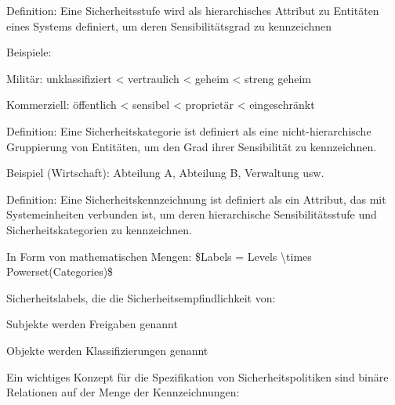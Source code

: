 \documentclass[a4paper]{article}
\begin{document}
\begin{multicols}{3}
      \begin{itemize*}
            \item Definition: Eine Sicherheitsstufe wird als hierarchisches Attribut zu
            Entitäten eines Systems definiert, um deren Sensibilitätsgrad zu
            kennzeichnen
            \begin{itemize*}
                  \item Beispiele:
                  \begin{itemize*} \item Militär: unklassifiziert \textless{} vertraulich \textless{} geheim \textless{} streng geheim \item Kommerziell: öffentlich \textless{} sensibel \textless{} proprietär \textless{} eingeschränkt \end{itemize*}
            \end{itemize*}
            \item Definition: Eine Sicherheitskategorie ist definiert als eine
            nicht-hierarchische Gruppierung von Entitäten, um den Grad ihrer
            Sensibilität zu kennzeichnen.
            \begin{itemize*}
                  \item Beispiel (Wirtschaft): Abteilung A, Abteilung B, Verwaltung usw.
            \end{itemize*}
            \item Definition: Eine Sicherheitskennzeichnung ist definiert als ein
            Attribut, das mit Systemeinheiten verbunden ist, um deren
            hierarchische Sensibilitätsstufe und Sicherheitskategorien zu
            kennzeichnen.
            \begin{itemize*}
                  \item In Form von mathematischen Mengen: \$Labels = Levels \textbackslash times Powerset(Categories)\$
            \end{itemize*}
            \item Sicherheitslabels, die die Sicherheitsempfindlichkeit von:
            \begin{itemize*}
                  \item Subjekte werden Freigaben genannt
                  \item Objekte werden Klassifizierungen genannt
            \end{itemize*}
            \item Ein wichtiges Konzept für die Spezifikation von Sicherheitspolitiken
            sind binäre Relationen auf der Menge der Kennzeichnungen:

\end{itemize*}
\end{multicols}
\end{document}
